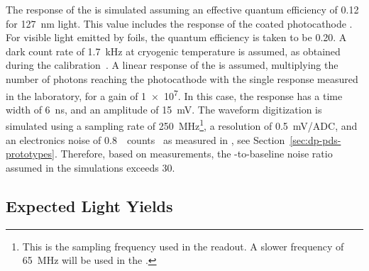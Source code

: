 The response of the  is simulated assuming an effective quantum efficiency of \num{0.12} for \SI{127}{\nm} light. This value includes the  response of the coated photocathode \cite{Bonesini:2018ubd}. For visible light emitted by  foils, the  quantum efficiency is taken to be \num{0.20}. A dark count rate of \SI{1.7}{\kilo\hertz} at cryogenic temperature is assumed, as obtained during the   calibration~\cite{Belver:2018erf}. A linear response of the  is assumed, multiplying the number of photons reaching the photocathode with the single \phel response measured in the laboratory, for a gain of \num{1e7}. In this case, the  response has a time width of \SI{6}{\nano\s}, and an amplitude of \SI{15}{mV}. The waveform digitization is simulated using a sampling rate of \SI{250}{MHz}\footnote{This is the sampling frequency used in the  readout. A slower frequency of \SI{65}{MHz} will be used in the  .}, 
a resolution of \SI{0.5}{mV/ADC}, and an electronics noise of \SI{0.8}{ counts } as measured in , see Section~\ref{sec:dp-pds-prototypes}. Therefore, based on  measurements, the -to-baseline noise  ratio assumed in the simulations exceeds \num{30}.


\subsection{Expected Light Yields}
\label{subsec:dp-pds-simulation_yields}

